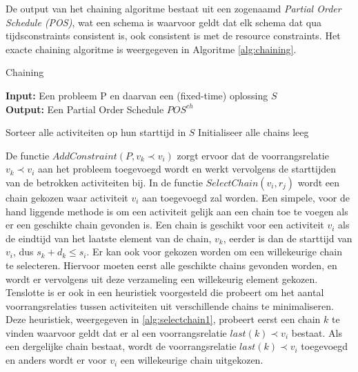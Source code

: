 De output van het chaining algoritme bestaat uit een zogenaamd \emph{Partial Order Schedule (POS)}, wat een schema is waarvoor geldt dat elk schema dat qua tijdsconstraints consistent is, ook consistent is met de resource constraints. Het exacte chaining algoritme is weergegeven in Algoritme \ref{alg:chaining}.

\begin{algorithm}
\caption{Chaining \cite{policella2007precedence}}
\label{alg:chaining}
\textbf{Input:} Een probleem P en daarvan een (fixed-time) oplossing $S$ \\
\textbf{Output:} Een Partial Order Schedule $POS^{ch}$
\begin{algorithmic}[1]
    \State Sorteer alle activiteiten op hun starttijd in $S$  
    \State Initialiseer alle chains leeg
        \EndFor
      \EndFor
    \EndFor
  \EndFunction
\end{algorithmic}
\end{algorithm}

De functie $AddConstraint(P,v_k \prec v_i)$ zorgt ervoor dat de voorrangsrelatie $v_k \prec v_i$ aan het probleem toegevoegd wordt en werkt vervolgens de starttijden van de betrokken activiteiten bij. In de functie $SelectChain(v_i,r_j)$ wordt een chain gekozen waar activiteit $v_i$ aan toegevoegd zal worden. Een simpele, voor de hand liggende methode is om een activiteit gelijk aan een chain toe te voegen als er een geschikte chain gevonden is. Een chain is geschikt voor een activiteit $v_i$ als de eindtijd van het laatste element van de chain, $v_k$, eerder is dan de starttijd van $v_i$, dus $s_k + d_k \leq s_i$. Er kan ook voor gekozen worden om een willekeurige chain te selecteren. Hiervoor moeten eerst alle geschikte chains gevonden worden, en wordt er vervolgens uit deze verzameling een willekeurig element gekozen. Tenslotte is er ook in \cite{policella2004generating} een heuristiek voorgesteld die probeert om het aantal voorrangsrelaties tussen activiteiten uit verschillende chains te minimaliseren. Deze heuristiek, weergegeven in \ref{alg:selectchain1}, probeert eerst een chain $k$ te vinden waarvoor geldt dat er al een voorrangsrelatie $last(k) \prec v_i$ bestaat. Als een dergelijke chain bestaat, wordt de voorrangsrelatie $last(k) \prec v_i$ toegevoegd en anders wordt er voor $v_i$ een willekeurige chain uitgekozen.

